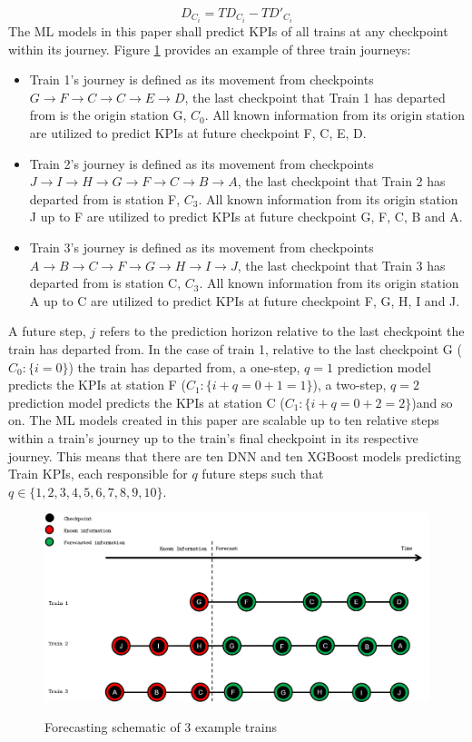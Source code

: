 \documentclass[]{interact}
\theoremstyle{plain}%
\theoremstyle{definition}
\theoremstyle{remark}
\begin{document}
\begin{equation}
    D_{C_i}=TD_{C_i}-TD\prime_{C_i}
\label{Equation:DepartureDelay}
\end{equation}
The ML models in this paper shall predict KPIs of all trains at any checkpoint within its journey. Figure \ref{ForecastProblem} provides an example of three train journeys: 
\begin{itemize}
    \item Train 1's journey is defined as its movement from checkpoints $G \rightarrow F \rightarrow C \rightarrow C \rightarrow E \rightarrow D$, the last checkpoint that Train 1 has departed from is the origin station G, $C_0$. All known information from its origin station are utilized to predict KPIs at future checkpoint F, C, E, D.
    \item Train 2's journey is defined as its movement from checkpoints $J \rightarrow I \rightarrow H \rightarrow G \rightarrow F \rightarrow C \rightarrow B \rightarrow A$, the last checkpoint that Train 2 has departed from is station F, $C_3$. All known information from its origin station J up to F are utilized to predict KPIs at future checkpoint G, F, C, B and A.
    \item Train 3's journey is defined as its movement from checkpoints $A \rightarrow B \rightarrow C \rightarrow F \rightarrow G \rightarrow H \rightarrow I \rightarrow J$, the last checkpoint that Train 3 has departed from is station C, $C_3$. All known information from its origin station A up to C are utilized to predict KPIs at future checkpoint F, G, H, I and J.
\end{itemize}
A future step, $j$ refers to the prediction horizon relative to the last checkpoint the train has departed from. In the case of train 1, relative to the last checkpoint G ($C_0:\{i=0\}$) the train has departed from, a one-step, $q=1$ prediction model predicts the KPIs at station F ($C_1:\{i+q=0+1=1\}$), a two-step, $q=2$ prediction model predicts the KPIs at station C ($C_1:\{i+q=0+2=2\}$)and so on. The ML models created in this paper are scalable up to ten relative steps within a train's journey up to the train's final checkpoint in its respective journey. This means that there are ten DNN and ten XGBoost models predicting Train KPIs, each responsible for $q$ future steps such that $q\in\{1,2,3,4,5,6,7,8,9,10\}$. 

\begin{figure}[H]
\centering
{%
{\includegraphics[width=\textwidth]{Images/ForecastProblem.png}}}
\caption{Forecasting schematic of 3 example trains} \label{ForecastProblem}
\end{figure}
\end{document}

